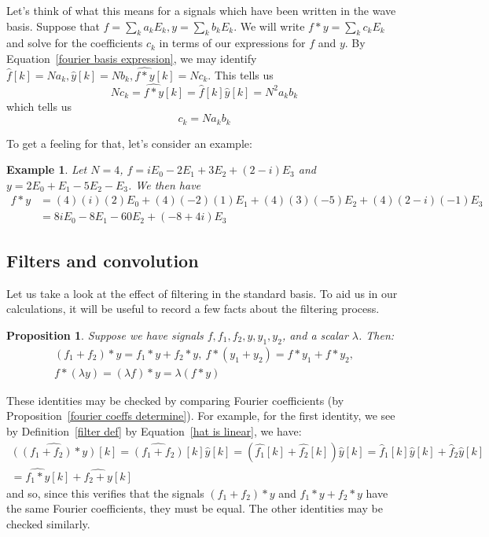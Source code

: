 \documentclass[12pt]{report}
\theoremstyle{plain}
\newtheorem{ex}[thm]{Example}
\newtheorem{prop}[thm]{Proposition}
\begin{document}
Let's think of what this means for a signals which have been written in the wave basis. Suppose that $f = \sum_k a_k E_k, y = \sum_k b_k E_k$. We will write $f * y = \sum_k c_k E_k$ and solve for the coefficients $c_k$ in terms of our expressions for $f$ and $y$. By Equation~\ref{fourier basis expression}, we may identify $\hat f[k] = N a_k, \hat y[k] = N b_k, \widehat{f * y}[k] = N c_k$. This tells us
\[ Nc_k = \widehat{f * y}[k] = \hat f[k] \hat y[k] = N^2 a_k b_k \]
which tells us
\begin{equation}
c_k = N a_k b_k
\end{equation}

To get a feeling for that, let's consider an example:

\begin{ex}
Let $N = 4$, $f = i E_0 - 2 E_1 + 3 E_2 + (2 - i) E_3$ and $y = 2 E_0 + E_1 - 5 E_2 - E_3$. We then have
\begin{align*}
f * y &= (4)(i)(2) E_0 + (4)(-2)(1) E_1 + (4)(3)(-5) E_2 + (4)(2 - i)(-1) E_3 \\
&= 8i E_0 - 8 E_1 - 60 E_2 + (-8 + 4i) E_3
\end{align*}
\end{ex}

\subsection{Filters and convolution}

Let us take a look at the effect of filtering in the standard basis. To aid us in our calculations, it will be useful to record a few facts about the filtering process.

\begin{prop}
Suppose we have signals $f, f_1, f_2, y, y_1, y_2$, and a scalar $\lambda$. Then:
\begin{gather*}
(f_1 + f_2) * y = f_1 * y + f_2 * y, \ f * (y_1 + y_2) = f * y_1 + f * y_2, \\ f * (\lambda y) = (\lambda f) * y = \lambda (f * y)
\end{gather*}
\end{prop}
These identities may be checked by comparing Fourier coefficients (by Proposition~\ref{fourier coeffs determine}). For example, for the first identity, we see by Definition~\ref{filter def} by Equation~\ref{hat is linear}, we have:
\begin{multline*}
\widehat{\left((f_1 + f_2)*y\right)}[k] = \widehat{(f_1 + f_2)}[k] \hat y[k] = (\hat{f_1}[k] + \hat{f_2}[k]) \hat y[k] = \hat f_1[k] \hat y[k] + \hat f_2 \hat y[k] \\
= \widehat{f_1 * y}[k] + \widehat{f_2 + y}[k]
\end{multline*}
and so, since this verifies that the signals $(f_1 + f_2)*y$ and $f_1 *y + f_2 * y$ have the same Fourier coefficients, they must be equal. The other identities may be checked similarly.
\end{document}
